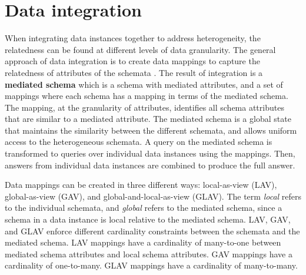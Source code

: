 \section{Data integration}
\label{sec:DataIntegration}

When integrating data instances together to address heterogeneity, the relatedness can be found at different levels of data granularity. The general approach of data integration is to create data mappings to capture the relatedness of attributes of the schemata \cite{Lenzerini2002Data}. The result of integration is a \textbf{\gls{mediated schema}} which is a schema with mediated attributes, and a set of mappings where each schema has a mapping in terms of the mediated schema. The mapping, at the granularity of attributes, identifies all schema attributes that are similar to a mediated attribute. The mediated schema is a global state that maintains the similarity between the different schemata, and allows uniform access to the heterogeneous schemata. A query on the mediated schema is transformed to queries over individual data instances using the mappings. Then, answers from individual data instances are combined to produce the full answer.

Data mappings can be created in three different ways: local-as-view (LAV), global-as-view (GAV), and global-and-local-as-view (GLAV). The term \textit{local} refers to the individual schemata, and \textit{global} refers to the mediated schema, since a schema in a data instance is local relative to the mediated schema. LAV, GAV, and GLAV enforce different cardinality constraints between the schemata and the mediated schema. LAV mappings have a cardinality of many-to-one between mediated schema attributes and local schema attributes. GAV mappings have a cardinality of one-to-many. GLAV mappings have a cardinality of many-to-many.

